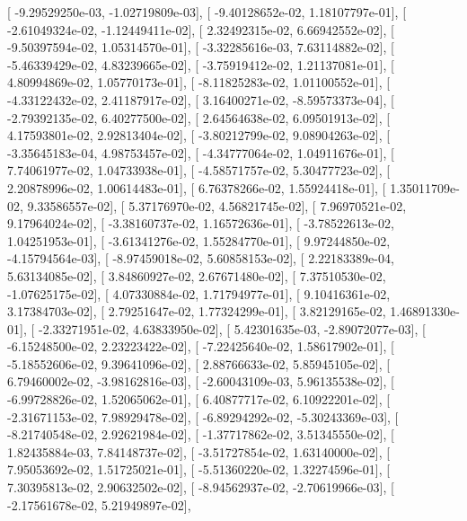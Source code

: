 \documentclass{article}
\begin{document}
       [ -9.29529250e-03,  -1.02719809e-03],
       [ -9.40128652e-02,   1.18107797e-01],
       [ -2.61049324e-02,  -1.12449411e-02],
       [  2.32492315e-02,   6.66942552e-02],
       [ -9.50397594e-02,   1.05314570e-01],
       [ -3.32285616e-03,   7.63114882e-02],
       [ -5.46339429e-02,   4.83239665e-02],
       [ -3.75919412e-02,   1.21137081e-01],
       [  4.80994869e-02,   1.05770173e-01],
       [ -8.11825283e-02,   1.01100552e-01],
       [ -4.33122432e-02,   2.41187917e-02],
       [  3.16400271e-02,  -8.59573373e-04],
       [ -2.79392135e-02,   6.40277500e-02],
       [  2.64564638e-02,   6.09501913e-02],
       [  4.17593801e-02,   2.92813404e-02],
       [ -3.80212799e-02,   9.08904263e-02],
       [ -3.35645183e-04,   4.98753457e-02],
       [ -4.34777064e-02,   1.04911676e-01],
       [  7.74061977e-02,   1.04733938e-01],
       [ -4.58571757e-02,   5.30477723e-02],
       [  2.20878996e-02,   1.00614483e-01],
       [  6.76378266e-02,   1.55924418e-01],
       [  1.35011709e-02,   9.33586557e-02],
       [  5.37176970e-02,   4.56821745e-02],
       [  7.96970521e-02,   9.17964024e-02],
       [ -3.38160737e-02,   1.16572636e-01],
       [ -3.78522613e-02,   1.04251953e-01],
       [ -3.61341276e-02,   1.55284770e-01],
       [  9.97244850e-02,  -4.15794564e-03],
       [ -8.97459018e-02,   5.60858153e-02],
       [  2.22183389e-04,   5.63134085e-02],
       [  3.84860927e-02,   2.67671480e-02],
       [  7.37510530e-02,  -1.07625175e-02],
       [  4.07330884e-02,   1.71794977e-01],
       [  9.10416361e-02,   3.17384703e-02],
       [  2.79251647e-02,   1.77324299e-01],
       [  3.82129165e-02,   1.46891330e-01],
       [ -2.33271951e-02,   4.63833950e-02],
       [  5.42301635e-03,  -2.89072077e-03],
       [ -6.15248500e-02,   2.23223422e-02],
       [ -7.22425640e-02,   1.58617902e-01],
       [ -5.18552606e-02,   9.39641096e-02],
       [  2.88766633e-02,   5.85945105e-02],
       [  6.79460002e-02,  -3.98162816e-03],
       [ -2.60043109e-03,   5.96135538e-02],
       [ -6.99728826e-02,   1.52065062e-01],
       [  6.40877717e-02,   6.10922201e-02],
       [ -2.31671153e-02,   7.98929478e-02],
       [ -6.89294292e-02,  -5.30243369e-03],
       [ -8.21740548e-02,   2.92621984e-02],
       [ -1.37717862e-02,   3.51345550e-02],
       [  1.82435884e-03,   7.84148737e-02],
       [ -3.51727854e-02,   1.63140000e-02],
       [  7.95053692e-02,   1.51725021e-01],
       [ -5.51360220e-02,   1.32274596e-01],
       [  7.30395813e-02,   2.90632502e-02],
       [ -8.94562937e-02,  -2.70619966e-03],
       [ -2.17561678e-02,   5.21949897e-02],
\end{document}
